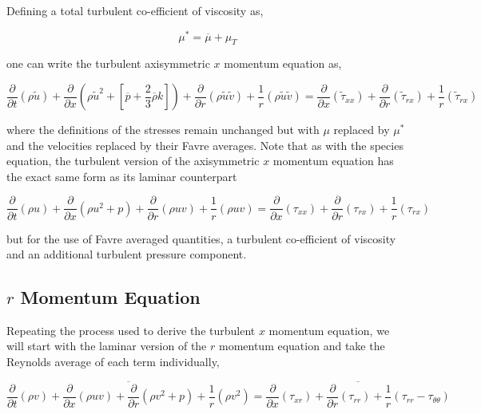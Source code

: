 	Defining a total turbulent co-efficient of viscosity as,

\begin{equation}
	\mu^* = \overline{\mu} + \mu_T
\label{eqn:mustar}
\end{equation}

	one can write the turbulent axisymmetric $x$ momentum equation as,

\begin{equation}	
	\frac{\partial}{\partial t}(\rho \tilde{u}) + \frac{\partial}{\partial x}(\rho \tilde{u}^2 + 
	[\overline{p}+\frac{2}{3}\overline{\rho}k]) +
	\frac{\partial}{\partial r}(\rho \tilde{u}\tilde{v}) + \frac{1}{r}(\rho \tilde{u} \tilde{v}) =  
	\frac{\partial}{\partial x}(\tilde{\tau}_{xx}) + \frac{\partial}{\partial r}(\tilde{\tau}_{rx}) 
	+ \frac{1}{r}(\tilde{\tau}_{rx})
\label{eqn:xmomfinalturb}
\end{equation}

	where the definitions of the stresses remain unchanged but with $\mu$ replaced by $\mu^*$ and the
velocities replaced by their Favre averages.  Note that as with the species equation, the turbulent version
of the axisymmetric $x$ momentum equation has the exact same form as its laminar counterpart

\begin{displaymath}
	\frac{\partial}{\partial t}(\rho u) + \frac{\partial}{\partial x}(\rho u^2 + p) +
	\frac{\partial}{\partial r}(\rho uv) + \frac{1}{r}(\rho u v) = 
	\frac{\partial}{\partial x}(\tau_{xx}) + \frac{\partial}{\partial r}(\tau_{rx}) + \frac{1}{r}(\tau_{rx})
\end{displaymath}

but for the use of Favre averaged quantities, a turbulent co-efficient of viscosity and an additional turbulent
pressure component.

\subsection{$r$ Momentum Equation}

	Repeating the process used to derive the turbulent $x$ momentum equation, we will start with the laminar
version of the $r$ momentum equation and take the Reynolds average of each term individually,

\begin{equation}
	\overline{\frac{\partial}{\partial t}(\rho v) + \frac{\partial}{\partial x}(\rho uv) +
	\frac{\partial}{\partial r}(\rho v^2 + p) + \frac{1}{r}(\rho v^2)} = 
	\overline{\frac{\partial}{\partial x}(\tau_{xr})
	+ \frac{\partial}{\partial r}(\tau_{rr}) + \frac{1}{r}(\tau_{rr} - \tau_{\theta \theta})}
\label{eqn:rmomshear2}
\end{equation}

